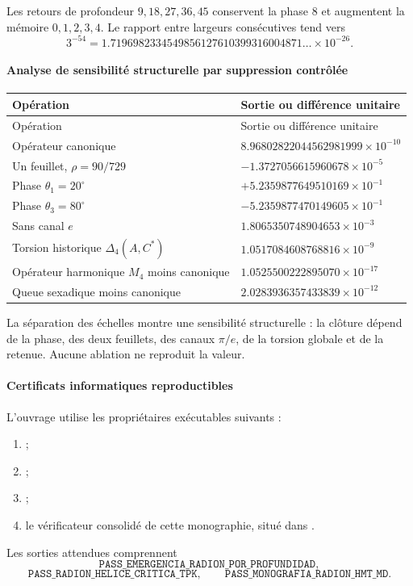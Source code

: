 Les retours de profondeur \(9,18,27,36,45\) conservent la phase \(8\) et
augmentent la mémoire \(0,1,2,3,4\). Le rapport entre largeurs consécutives tend
vers
\[
3^{-54}=1.7196982334549856127610399316004871\ldots\times10^{-26}.
\]

\paragraph{Analyse de sensibilité structurelle par suppression contrôlée}

\begin{longtable}{p{} p{}}
\toprule
Opération & Sortie ou différence unitaire\\
\midrule
\endfirsthead
\toprule
Opération & Sortie ou différence unitaire\\
\midrule
\endhead
Opérateur canonique & \(8.96802822044562981999\times10^{-10}\)\\
Un feuillet, \(\rho=90/729\) & \(-1.3727056615960678\times10^{-5}\)\\
Phase \(\theta_1=20^\circ\) & \(+5.2359877649510169\times10^{-1}\)\\
Phase \(\theta_3=80^\circ\) & \(-5.2359877470149605\times10^{-1}\)\\
Sans canal \(e\) & \(1.8065350748904653\times10^{-3}\)\\
Torsion historique \(\Delta_4(A,C^*)\) & \(1.0517084608768816\times10^{-9}\)\\
Opérateur harmonique \(M_4\) moins canonique & \(1.0525500222895070\times10^{-17}\)\\
Queue sexadique moins canonique & \(2.0283936357433839\times10^{-12}\)\\
\bottomrule
\end{longtable}

La séparation des échelles montre une sensibilité structurelle : la clôture dépend
de la phase, des deux feuillets, des canaux \(\pi/e\), de la torsion globale et de la retenue.
Aucune ablation ne reproduit la valeur.

\paragraph{Certificats informatiques reproductibles}

L'ouvrage utilise les propriétaires exécutables suivants :
\begin{enumerate}
\item {};
\item {};
\item {};
\item le vérificateur consolidé de cette monographie, situé dans
.
\end{enumerate}
Les sorties attendues comprennent
\[
\texttt{PASS\_EMERGENCIA\_RADION\_POR\_PROFUNDIDAD},
\]
\[
\texttt{PASS\_RADION\_HELICE\_CRITICA\_TPK},
\qquad
\texttt{PASS\_MONOGRAFIA\_RADION\_HMT\_MD}.
\]

